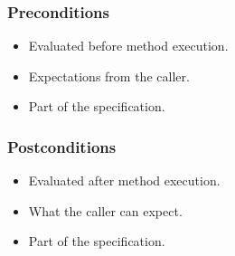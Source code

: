 \begin{frame}
    \frametitle{Preconditions}
    \begin{itemize}
        \item Evaluated before method execution.
        \pause \item Expectations from the caller.
        \pause \item Part of the specification.
    \end{itemize}
\end{frame}

\begin{frame}
    \frametitle{Postconditions}
    \begin{itemize}
        \item Evaluated after method execution.
        \pause \item What the caller can expect.
        \pause \item Part of the specification.
    \end{itemize}
\end{frame}
